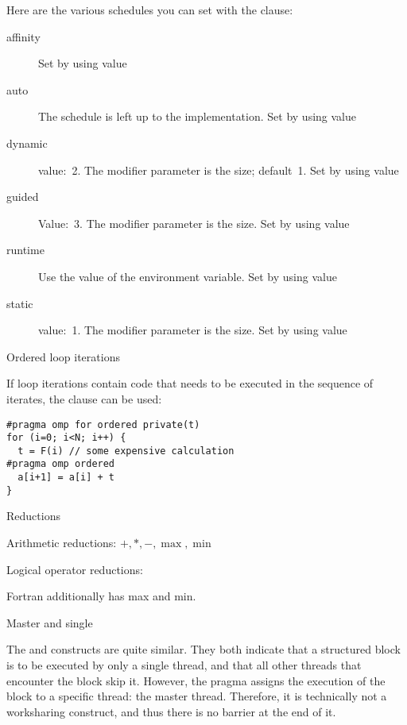 Here are the various schedules you can set with the
 clause:
\begin{description}
  \item[affinity] Set by using value  
  \item[auto] The schedule is left up to the implementation. Set by
    using value 
  \item[dynamic] value:~2. The modifier parameter is the
     size; default~1. Set by using value
  \item[guided] Value:~3. The modifier parameter is the
     size. Set by using value
  \item[runtime] Use the value of the 
    environment variable. Set by using value
  \item[static] value:~1. The modifier parameter is the  size. Set by using value  
\end{description}

 {Ordered loop iterations}

If loop iterations contain code that needs to be executed in the sequence of iterates,
the  clause can be used:
\begin{verbatim}
#pragma omp for ordered private(t)
for (i=0; i<N; i++) {
  t = F(i) // some expensive calculation
#pragma omp ordered
  a[i+1] = a[i] + t
}
\end{verbatim}

 {Reductions}

Arithmetic reductions: $+,*,-,\max,\min$

Logical operator reductions: \n{&,&&,|,||,^}

Fortran additionally has max and min.

 {Master and single}

The  and  constructs
are quite similar. They both indicate that a structured block
is to be executed by only a single thread, and that all other threads
that encounter the block skip it. However, the  pragma
assigns the execution of the block to a specific thread: the master thread.
Therefore, it is technically not a worksharing construct, and thus
there is no barrier at the end of it.

